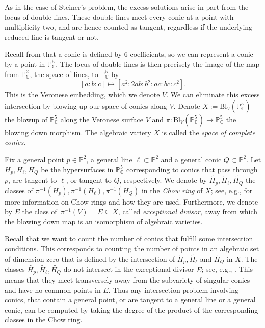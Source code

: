 \documentclass[12pt]{amsart}
\theoremstyle{definition}
\theoremstyle{definition}
\numberwithin{equation}{section}
\begin{document}
As in the case of Steiner's problem, the excess solutions arise in part from the locus of double lines. These double lines meet every conic at a point with multiplicity two, and are hence counted as tangent, regardless if the underlying reduced line is tangent or not.

Recall from  that a conic is defined by 6 coefficients, so we can represent a conic by a point in $\mathbb P^5_{\mathbb C}$.
The locus of double lines is then precisely the image of the map from $\mathbb{P}^{2}_{\mathbb{C}}$, the space of lines, to $\mathbb{P}^{5}_{\mathbb{C}}$ by
$$[a:b:c]\mapsto[a^{2}:2ab:b^{2}:ac:bc:c^{2}].$$
This is the Veronese embedding, which we denote $V$. We can eliminate this excess intersection by blowing up our space of conics along $V$. Denote $X:=\mathrm{Bl}_{V}(\mathbb{P}^{5}_{\mathbb{C}})$ the blowup of $\mathbb{P}^{5}_{\mathbb{C}}$ along the Veronese surface $V$ and $\pi:\mathrm{Bl}_{V}(\mathbb{P}^{5}_{\mathbb{C}})\to\mathbb{P}^{5}_{\mathbb{C}}$ the blowing down morphism. The algebraic variety $X$ is called the \emph{space of complete conics}.

Fix a general point $p\in \mathbb{P}^{2}$, a general line $\ell \subset \mathbb{P}^{2}$ and a general conic $Q\subset \mathbb{P}^{2}$. Let $H_{p}, H_{\ell}, H_{Q}$ be the hypersurfaces in $\mathbb{P}^{5}_{\mathbb{C}}$ corresponding to conics that pass through~$p$, are tangent to $\ell$, or tangent to $Q$, respectively. We denote by $\widetilde{H_{p}}, \widetilde{H_{\ell}}, \widetilde{H_{Q}}$ the classes of $\pi^{-1}(H_p), \pi^{-1}(H_\ell), \pi^{-1}(H_Q)$ in the \emph{Chow ring} of $X$; see, e.g., \cite[Chapter 1]{3264AllThat} for more information on Chow rings and how they are used. Furthermore, we denote by $E$ the class of~$\pi^{-1}(V)=E\subseteq X$, called \emph{exceptional divisor}, away from which the blowing down map is an isomorphism of algebraic varieties. 

Recall that we want to count the number of conics that fulfill some intersection conditions. This corresponds to counting the number of points in an algebraic set of dimension zero that is defined by the intersection of  $\widetilde{H_{p}}, \widetilde{H_{\ell}}$ and $\widetilde{H_{Q}}$ in $X$. The classes $\widetilde{H_{p}}, \widetilde{H_{\ell}}, \widetilde{H_{Q}}$ do not intersect in the exceptional divisor $E$; see, e.g., \cite[p. 749-56]{PrinciplesAG}. This means that they meet transversely away from the subvariety of singular conics and have no common points in $E$. Thus any intersection problem involving conics, that contain a general point, or are tangent to a general line or a general conic, can be computed by taking the degree of the product of the corresponding classes in the Chow ring.  
\end{document}
